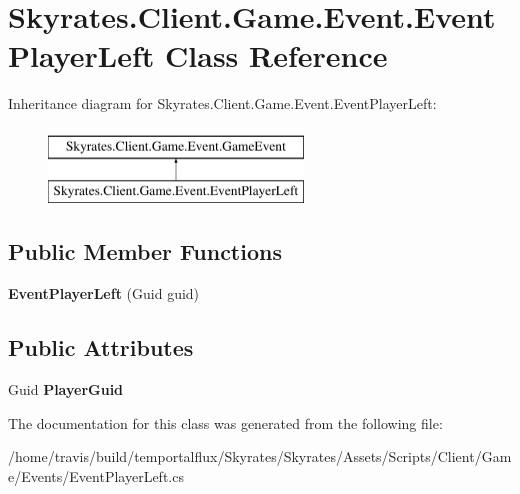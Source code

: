 \hypertarget{class_skyrates_1_1_client_1_1_game_1_1_event_1_1_event_player_left}{\section{Skyrates.\-Client.\-Game.\-Event.\-Event\-Player\-Left Class Reference}
\label{class_skyrates_1_1_client_1_1_game_1_1_event_1_1_event_player_left}
}
Inheritance diagram for Skyrates.\-Client.\-Game.\-Event.\-Event\-Player\-Left\-:\begin{figure}[H]
\begin{center}
\leavevmode
\includegraphics[height=2.000000cm]{class_skyrates_1_1_client_1_1_game_1_1_event_1_1_event_player_left}
\end{center}
\end{figure}
\subsection*{Public Member Functions}
\begin{DoxyCompactItemize}
\item 
\hypertarget{class_skyrates_1_1_client_1_1_game_1_1_event_1_1_event_player_left_ad1f2303f537d505941bb982b228dcd04}{{\bfseries Event\-Player\-Left} (Guid guid)}\label{class_skyrates_1_1_client_1_1_game_1_1_event_1_1_event_player_left_ad1f2303f537d505941bb982b228dcd04}

\end{DoxyCompactItemize}
\subsection*{Public Attributes}
\begin{DoxyCompactItemize}
\item 
\hypertarget{class_skyrates_1_1_client_1_1_game_1_1_event_1_1_event_player_left_acf2e0404fa31a728d52f9fd12fec8bd3}{Guid {\bfseries Player\-Guid}}\label{class_skyrates_1_1_client_1_1_game_1_1_event_1_1_event_player_left_acf2e0404fa31a728d52f9fd12fec8bd3}

\end{DoxyCompactItemize}


The documentation for this class was generated from the following file\-:\begin{DoxyCompactItemize}
\item 
/home/travis/build/temportalflux/\-Skyrates/\-Skyrates/\-Assets/\-Scripts/\-Client/\-Game/\-Events/Event\-Player\-Left.\-cs\end{DoxyCompactItemize}

